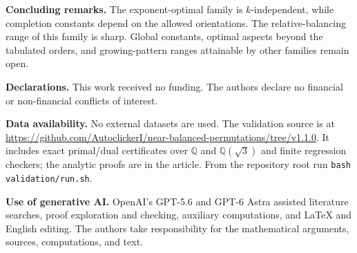 \documentclass[11pt,letterpaper]{article}
\begin{document}


\medskip\noindent\textbf{Concluding remarks.}
The exponent-optimal family is $k$-independent, while completion constants
depend on the allowed orientations. The relative-balancing range of this
family is sharp. Global constants, optimal aspects beyond the tabulated orders,
and growing-pattern ranges attainable by other families remain open.

\medskip\noindent\textbf{Declarations.} This work received no funding. The authors
declare no financial or non-financial conflicts of interest.

\noindent\textbf{Data availability.} No external datasets are used.
The validation source is at
\url{https://github.com/AutoclickerI/near-balanced-permutations/tree/v1.1.0}.
It includes exact primal/dual certificates over $\mathbb Q$ and
$\mathbb Q(\sqrt3)$ and finite regression checkers; the analytic proofs
are in the article. From the repository root run \texttt{bash validation/run.sh}.

\noindent\textbf{Use of generative AI.} OpenAI's GPT-5.6 and GPT-6 Astra
assisted literature searches, proof exploration and checking, auxiliary
computations, and LaTeX and English editing.  The authors
take responsibility for the mathematical arguments, sources, computations, and
text.
\end{document}
